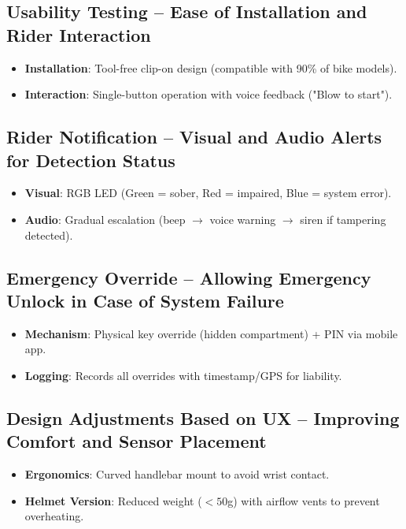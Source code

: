 \documentclass{article}
\begin{document}
\subsection{Usability Testing -- Ease of Installation and Rider Interaction}
\begin{itemize}
    \item \textbf{Installation}: Tool-free clip-on design (compatible with 90\% of bike models).
    \item \textbf{Interaction}: Single-button operation with voice feedback ("Blow to start").
\end{itemize}

\subsection{Rider Notification -- Visual and Audio Alerts for Detection Status}
\begin{itemize}
    \item \textbf{Visual}: RGB LED (Green = sober, Red = impaired, Blue = system error).
    \item \textbf{Audio}: Gradual escalation (beep $\rightarrow$ voice warning $\rightarrow$ siren if tampering detected).
\end{itemize}

\subsection{Emergency Override -- Allowing Emergency Unlock in Case of System Failure}
\begin{itemize}
    \item \textbf{Mechanism}: Physical key override (hidden compartment) + PIN via mobile app.
    \item \textbf{Logging}: Records all overrides with timestamp/GPS for liability.
\end{itemize}

\subsection{Design Adjustments Based on UX -- Improving Comfort and Sensor Placement}
\begin{itemize}
    \item \textbf{Ergonomics}: Curved handlebar mount to avoid wrist contact.
    \item \textbf{Helmet Version}: Reduced weight ($<50$g) with airflow vents to prevent overheating.
\end{itemize}
\end{document}
